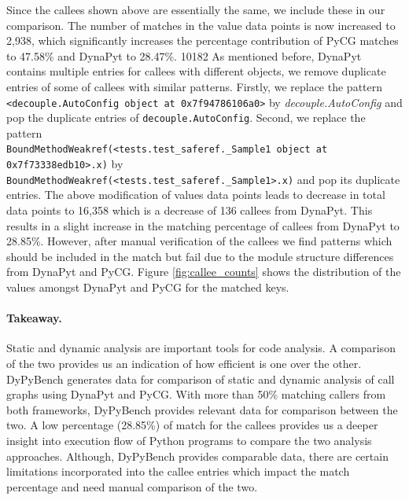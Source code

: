 Since the callees shown above are essentially the same, we include these in our comparison.
The number of matches in the value data points is now increased to 2,938, which significantly increases the percentage contribution of PyCG matches to 47.58\% and DynaPyt to 28.47\%. 10182
As mentioned before, DynaPyt contains multiple entries for callees with different objects, we remove duplicate entries of some of callees with similar patterns.
Firstly, we replace the pattern \verb|<decouple.AutoConfig object at 0x7f94786106a0>| by \textit{decouple.AutoConfig} and pop the duplicate entries of \verb|decouple.AutoConfig|.
Second, we replace the pattern \\\verb|BoundMethodWeakref(<tests.test_saferef._Sample1 object at 0x7f73338edb10>.x)| by \\\verb|BoundMethodWeakref(<tests.test_saferef._Sample1>.x)| and pop its duplicate entries.
The above modification of values data points leads to decrease in total data points to 16,358 which is a decrease of 136 callees from DynaPyt.
This results in a slight increase in the matching percentage of callees from DynaPyt to 28.85\%.
However, after manual verification of the callees we find patterns which should be included in the match but fail due to the module structure differences from DynaPyt and PyCG.
Figure \ref{fig:callee_counts} shows the distribution of the values amongst DynaPyt and PyCG for the matched keys.

\paragraph{Takeaway.} Static and dynamic analysis are important tools for code analysis.
A comparison of the two provides us an indication of how efficient is one over the other.
DyPyBench generates data for comparison of static and dynamic analysis of call graphs using DynaPyt and PyCG.
With more than 50\% matching callers from both frameworks, DyPyBench provides relevant data for comparison between the two.
A low percentage (28.85\%) of match for the callees provides us a deeper insight into execution flow of Python programs to compare the two analysis approaches.
Although, DyPyBench provides comparable data, there are certain limitations incorporated into the callee entries which impact the match percentage and need manual comparison of the two.
